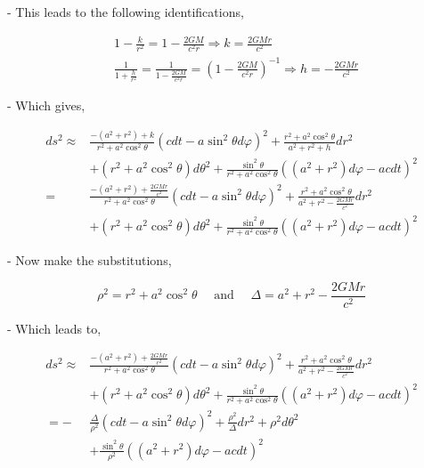 - This leads to the following identifications,


\begin{align}
     & 1-\frac{k}{r^2}=1-\frac{2 G M}{c^2 r} \Rightarrow k=\frac{2 G M r}{c^2}                                                              \\
     & \frac{1}{1+\frac{h}{r^2}}=\frac{1}{1-\frac{2 G M}{c^2 r}}=\left(1-\frac{2 G M}{c^2 r}\right)^{-1} \Rightarrow h=-\frac{2 G M r}{c^2}
\end{align}


- Which gives,


\begin{align}
    d s^2 \approx & \frac{-\left(a^2+r^2\right)+k}{r^2+a^2 \cos ^2 \theta}\left(c d t-a \sin ^2 \theta d \varphi\right)^2+\frac{r^2+a^2 \cos ^2 \theta}{a^2+r^2+h} d r^2                                     \\
                  & +\left(r^2+a^2 \cos ^2 \theta\right) d \theta^2+\frac{\sin ^2 \theta}{r^2+a^2 \cos ^2 \theta}\left(\left(a^2+r^2\right) d \varphi-a c d t\right)^2                                       \\
    =             & \frac{-\left(a^2+r^2\right)+\frac{2 G M r}{c^2}}{r^2+a^2 \cos ^2 \theta}\left(c d t-a \sin ^2 \theta d \varphi\right)^2+\frac{r^2+a^2 \cos ^2 \theta}{a^2+r^2-\frac{2 G M r}{c^2}} d r^2 \\
                  & +\left(r^2+a^2 \cos ^2 \theta\right) d \theta^2+\frac{\sin ^2 \theta}{r^2+a^2 \cos ^2 \theta}\left(\left(a^2+r^2\right) d \varphi-a c d t\right)^2
\end{align}


- Now make the substitutions,

$$
    \rho^2=r^2+a^2 \cos ^2 \theta \quad \text { and } \quad \Delta=a^2+r^2-\frac{2 G M r}{c^2}
$$

- Which leads to,


\begin{align}
    d s^2 \approx & \frac{-\left(a^2+r^2\right)+\frac{2 G M r}{c^2}}{r^2+a^2 \cos ^2 \theta}\left(c d t-a \sin ^2 \theta d \varphi\right)^2+\frac{r^2+a^2 \cos ^2 \theta}{a^2+r^2-\frac{2 G M r}{c^2}} d r^2 \\
                  & +\left(r^2+a^2 \cos ^2 \theta\right) d \theta^2+\frac{\sin ^2 \theta}{r^2+a^2 \cos ^2 \theta}\left(\left(a^2+r^2\right) d \varphi-a c d t\right)^2                                       \\
    =-            & \frac{\Delta}{\rho^2}\left(c d t-a \sin ^2 \theta d \varphi\right)^2+\frac{\rho^2}{\Delta} d r^2+\rho^2 d \theta^2                                                                       \\
                  & +\frac{\sin ^2 \theta}{\rho^2}\left(\left(a^2+r^2\right) d \varphi-a c d t\right)^2
\end{align}


